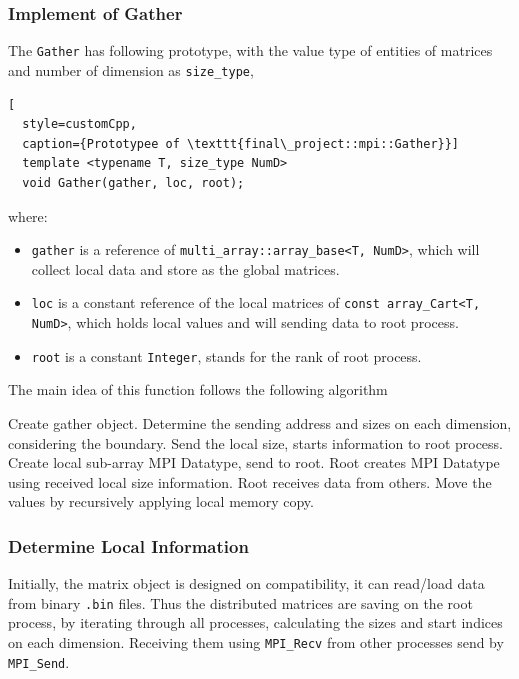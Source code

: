 \subsubsection{Implement of Gather}
The \texttt{Gather} has following prototype, with the value type of entities of matrices and number of dimension as \texttt{size\_type},
\begin{lstlisting}[
  style=customCpp,
  caption={Prototypee of \texttt{final\_project::mpi::Gather}}]
  template <typename T, size_type NumD> 
  void Gather(gather, loc, root);
\end{lstlisting}
where:
\begin{itemize}
  \item \texttt{gather} is a reference of \texttt{multi\_array::array\_base<T, NumD>}, which will collect local data and store as the global matrices.
  \item \texttt{loc}    is a constant reference of the local matrices of \texttt{const array\_Cart<T, NumD>}, which holds local values and will sending data to root process.
  \item \texttt{root}   is a constant \texttt{Integer}, stands for the rank of root process.
\end{itemize}
The main idea of this function follows the following algorithm
\begin{algorithm}
  \caption{Scheme of Gather local matrices to Root process.}
  \begin{algorithmic}[1]
    \STATE Create gather object.
    \STATE Determine the sending address and sizes on each dimension, considering the boundary.
    \STATE Send the local size, starts information to root process.
      \STATE Create local sub-array MPI Datatype, send to root.
    \ELSE  
          \STATE Root creates MPI Datatype using received local size information.
          \STATE Root receives data from others.
        \ELSE 
          \STATE Move the values by recursively applying local memory copy.
        \ENDIF
      \ENDFOR
    \ENDIF
  \end{algorithmic}
\end{algorithm}

\subsubsection{Determine Local Information}
Initially, the matrix object is designed on compatibility, it can read/load data from binary \texttt{.bin} files.
Thus the distributed matrices are saving  on the root process, by iterating through all processes, calculating the sizes 
and start indices on each dimension. Receiving them using \texttt{MPI\_Recv} from other processes send by \texttt{MPI\_Send}.

